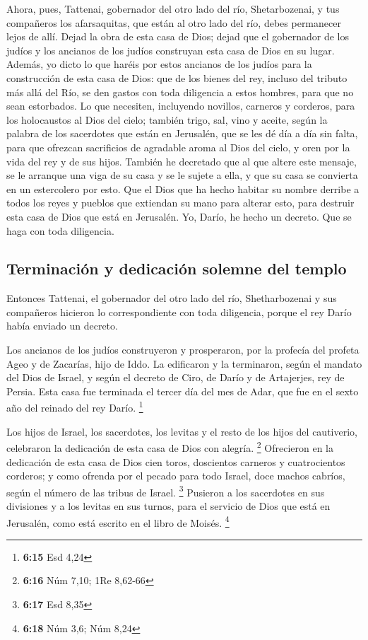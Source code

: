 \begin{paracol}{2}
 Ahora, pues, Tattenai, gobernador del otro lado del río,
Shetarbozenai, y tus compañeros los afarsaquitas, que están al otro lado
del río, debes permanecer lejos de allí.  Dejad la obra de
esta casa de Dios; dejad que el gobernador de los judíos y los ancianos
de los judíos construyan esta casa de Dios en su lugar. 
Además, yo dicto lo que haréis por estos ancianos de los judíos para la
construcción de esta casa de Dios: que de los bienes del rey, incluso
del tributo más allá del Río, se den gastos con toda diligencia a estos
hombres, para que no sean estorbados.  Lo que necesiten,
incluyendo novillos, carneros y corderos, para los holocaustos al Dios
del cielo; también trigo, sal, vino y aceite, según la palabra de los
sacerdotes que están en Jerusalén, que se les dé día a día sin falta,
 para que ofrezcan sacrificios de agradable aroma al Dios
del cielo, y oren por la vida del rey y de sus hijos. 
También he decretado que al que altere este mensaje, se le arranque una
viga de su casa y se le sujete a ella, y que su casa se convierta en un
estercolero por esto.  Que el Dios que ha hecho habitar
su nombre derribe a todos los reyes y pueblos que extiendan su mano para
alterar esto, para destruir esta casa de Dios que está en Jerusalén. Yo,
Darío, he hecho un decreto. Que se haga con toda diligencia.

\hypertarget{terminaciuxf3n-y-dedicaciuxf3n-solemne-del-templo}{%
\subsection{Terminación y dedicación solemne del
templo}\label{terminaciuxf3n-y-dedicaciuxf3n-solemne-del-templo}}

 Entonces Tattenai, el gobernador del otro lado del río,
Shetharbozenai y sus compañeros hicieron lo correspondiente con toda
diligencia, porque el rey Darío había enviado un decreto.

 Los ancianos de los judíos construyeron y prosperaron,
por la profecía del profeta Ageo y de Zacarías, hijo de Iddo. La
edificaron y la terminaron, según el mandato del Dios de Israel, y según
el decreto de Ciro, de Darío y de Artajerjes, rey de Persia.
 Esta casa fue terminada el tercer día del mes de Adar,
que fue en el sexto año del reinado del rey Darío. \footnote{\textbf{6:15}
  Esd 4,24}

 Los hijos de Israel, los sacerdotes, los levitas y el
resto de los hijos del cautiverio, celebraron la dedicación de esta casa
de Dios con alegría. \footnote{\textbf{6:16} Núm 7,10; 1Re 8,62-66}
 Ofrecieron en la dedicación de esta casa de Dios cien
toros, doscientos carneros y cuatrocientos corderos; y como ofrenda por
el pecado para todo Israel, doce machos cabríos, según el número de las
tribus de Israel. \footnote{\textbf{6:17} Esd 8,35} 
Pusieron a los sacerdotes en sus divisiones y a los levitas en sus
turnos, para el servicio de Dios que está en Jerusalén, como está
escrito en el libro de Moisés. \footnote{\textbf{6:18} Núm 3,6; Núm 8,24}


\end{paracol}

